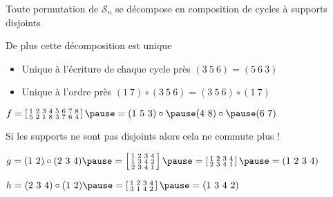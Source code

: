 \begin{frame}

\begin{theoreme}
Toute permutation de $\mathcal{S}_n$ se décompose en composition
de cycles à supports disjoints

\pause

De plus cette décomposition est unique
\end{theoreme}

\pause

\begin{itemize}
  \item Unique à l'écriture de chaque cycle près
\hfill $(3\ 5\ 6)=(5\ 6\ 3)$

\pause
  \item Unique à l'ordre près
\hfill $(1\ 7) \circ (3\ 5\ 6)= (3\ 5\ 6) \circ (1\ 7)$
\end{itemize}
\pause


\begin{exemple}
\centerline {$
f = \left[\begin{smallmatrix} 
 1 & 2 & 3 & 4 & 5 & 6 & 7 & 8 \\  
 5 & 2 & 1 & 8 & 3 & 7 & 6 & 4 \\      
        \end{smallmatrix} \right]
\pause =  (1\ 5\ 3) \circ \pause (4\ 8) \circ \pause (6\ 7)$
}
\end{exemple}

\pause
Si les supports ne sont pas disjoints alors cela ne commute plus !

\pause

\begin{exemple}
$g = (1\ 2)\circ(2\ 3\ 4) 
\pause
= 
\left[\begin{smallmatrix} 
 1 & 2 & 3 & 4 \\  
 1 & 3 & 4 & 2 \\   
 2 & 3 & 4 & 1 \\  
\end{smallmatrix} \right] 
\pause
=
\left[\begin{smallmatrix} 
 1 & 2 & 3 & 4 \\  
 2 & 3 & 4 & 1 \\      
\end{smallmatrix} \right] 
\pause =
(1\ 2\ 3\ 4)$

\pause

$h = (2\ 3\ 4)\circ(1\ 2) 
\pause = 
\left[\begin{smallmatrix} 
 1 & 2 & 3 & 4 \\  
 3 & 1 & 4 & 2 \\      
\end{smallmatrix} \right]
\pause 
= (1\ 3\ 4\ 2)$ 
\end{exemple}

\end{frame}







